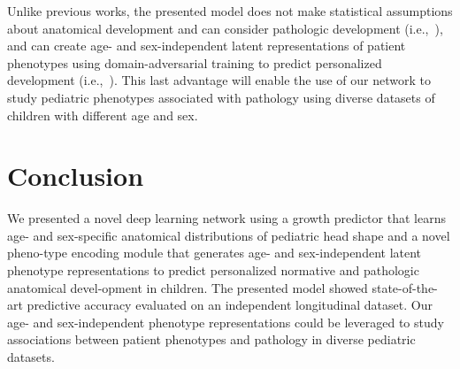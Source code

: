 \documentclass[conference]{IEEEtran}
\begin{document}
Unlike previous works, the presented model does not make statistical assumptions about anatomical development and can consider pathologic development (i.e.,~\cite{Porras2022Predictive,Liu2022Data-driven}), and can create age- and sex-independent latent representations of patient phenotypes using domain-adversarial training to predict personalized development (i.e.,~\cite{Ganin2016Domain-Adversarial,Wang2021Deep}). This last advantage will enable the use of our network to study pediatric phenotypes associated with pathology using diverse datasets of children with different age and sex.
\section{Conclusion}
We presented a novel deep learning network using a growth predictor that learns age- and sex-specific anatomical distributions of pediatric head shape and a novel pheno-type encoding module that generates age- and sex-independent latent phenotype representations to predict personalized normative and pathologic anatomical devel-opment in children. The presented model showed state-of-the-art predictive accuracy evaluated on an independent longitudinal dataset. Our age- and sex-independent phenotype representations could be leveraged to study associations between patient phenotypes and pathology in diverse pediatric datasets.



\end{document}
